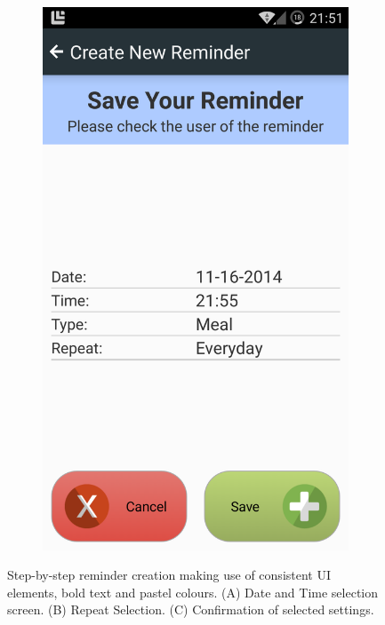 \begin{figure}[h]
\begin{subfigure}[t]{0.3\textwidth}
        \includegraphics[width=\textwidth]{Files/treatment-study-1/figures/app-remindercreate-confirmation}
        \caption{}
        \label{fig: remindercreate-confirmation}
    \end{subfigure}
    \caption{Step-by-step reminder creation making use of consistent UI elements, bold text and pastel colours. (A) Date and Time selection screen. (B) Repeat Selection. (C) Confirmation of selected settings.}
    \label{fig: taut-remindercreation}
\end{figure}

